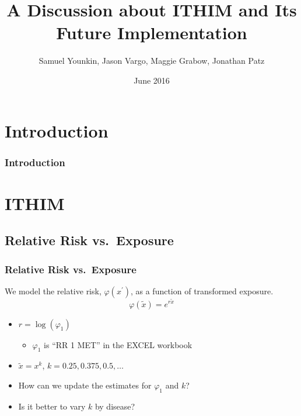\documentclass[handout,13pt,compress,c]{beamer}
\title[ITHIM]{A Discussion about ITHIM and Its Future Implementation}
\author[Younkin et al.]{\small{Samuel Younkin, Jason Vargo, Maggie Grabow, Jonathan Patz}}
\institute{Global Health Institute\\University of Wisconsin-Madison}
\date{\tiny{June 2016}}
\newcommand{\ft}[1]{\frametitle{#1}}
\newcommand{\bi}{\begin{itemize}}
\newcommand{\ei}{\end{itemize}}
\begin{document}
\frame{\titlepage}
\section{Introduction}
\begin{frame}[fragile]
\frametitle{Introduction}
\end{frame}
\frame{
   \ft{Outline}
\tableofcontents
}
\section{ITHIM}
\subsection{Relative Risk vs.\ Exposure}
\begin{frame}[fragile]
\frametitle{Relative Risk vs.\ Exposure}
We model the relative risk, $\varphi(x^\prime)$, as a function of
transformed exposure.
\begin{equation}
\varphi\left(\tilde{x}\right) = e^{r \tilde{x}}
\end{equation}
\bi
\item $r=\log\left(\varphi_1\right)$ \bi\item$\varphi_1$ is ``RR 1 MET'' in the EXCEL workbook\ei
\item $\tilde{x}=x^k$, $k=0.25,0.375,0.5,\ldots$
\ei
\bi
\item How can we update the estimates for $\varphi_1$ and $k$?
\item Is it better to vary $k$ by disease?\ei
\end{frame}
\end{document}
